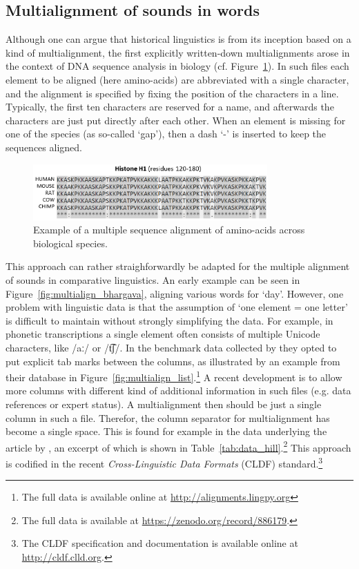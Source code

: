 \documentclass[11pt]{article}
\begin{document}
\subsection{Multialignment of sounds in words}

Although one can argue that historical linguistics is from its inception based on a kind of multialignment, the first explicitly written-down multialignments arose in the context of DNA sequence analysis in biology (cf. Figure~\ref{fig:aminoacids}). In such files each element to be aligned (here amino-acids) are abbreviated with a single character, and the alignment is specified by fixing the position of the characters in a line. Typically, the first ten characters are reserved for a name, and afterwards the characters are just put directly after each other. When an element is missing for one of the species (as so-called `gap'), then a dash `-' is inserted to keep the sequences aligned.

\begin{figure}[htbp] 
	\centering
	\includegraphics[width=0.8\textwidth]{images/Histone_Alignment.png}
 	\caption{Example of a multiple sequence alignment of amino-acids across biological species.\protect\footnotemark}
	\label{fig:aminoacids}
\end{figure}

This approach can rather straighforwardly be adapted for the multiple alignment of sounds in comparative linguistics. An early example can be seen in Figure~\ref{fig:multialign_bhargava}, aligning various words for `day'. However, one problem with linguistic data is that the assumption of `one element = one letter' is difficult to maintain without strongly simplifying the data. For example, in phonetic transcriptions a single element often consists of multiple Unicode characters, like /aː/ or /t͡ʃ/. In the benchmark data collected by \textcite{list2014benchmark} they opted to put explicit tab marks between the columns, as illustrated by an example from their database in Figure~\ref{fig:multialign_list}.\footnote{The full data is available online at \url{http://alignments.lingpy.org}} A recent development is to allow more columns with different kind of additional information in such files (e.g. data references or expert status). A multialignment then should be just a single column in such a file. Therefor, the column separator for multialignment has become a single space. This is found for example in the data underlying the article by \textcite{hill2017}, an excerpt of which is shown in Table~\ref{tab:data_hill}.\footnote{The full data is available at \url{https://zenodo.org/record/886179}.} This approach is codified in the recent \textit{Cross-Linguistic Data Formats} (CLDF) standard.\footnote{The CLDF specification and documentation is available online at \url{http://cldf.clld.org}.}
\end{document}
